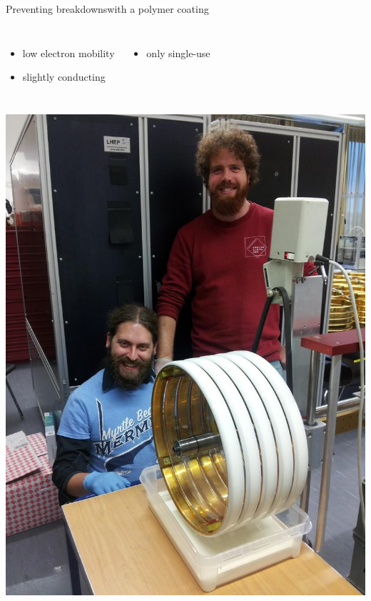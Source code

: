 \documentclass[]{beamer}
\newcommand*{\emphcol}{red}
\begin{document}
\begin{frame}{Preventing breakdowns}{with a polymer coating}
	\begin{columns}[c]
		\begin{itemize}
			\item low electron mobility
			\item slightly conducting
		\end{itemize}
		\begin{itemize}
			\item {\color{\emphcol} only single-use}
		\end{itemize}
	\end{columns}
	\begin{columns}[c]
		\centering
		\includegraphics[width=\textwidth]{defence/coating}
		\centering

\end{columns}
\end{frame}
\end{document}
